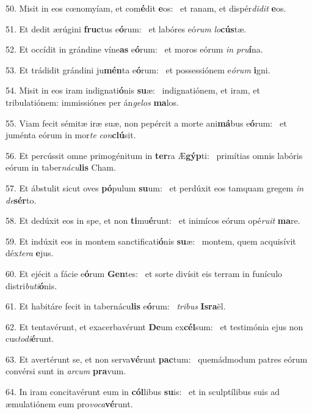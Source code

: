 50. Misit in eos cœnomyíam, et com\textbf{é}dit \textbf{e}os: \ast\  et ranam, et dispér\textit{di}\textit{dit} \textbf{e}os.\

51. Et dedit ærúgini \textbf{fruc}tus e\textbf{ó}rum: \ast\  et labóres eó\textit{rum} \textit{lo}\textbf{cús}tæ.\

52. Et occídit in grándine víne\textbf{as} e\textbf{ó}rum: \ast\  et moros eórum \textit{in} \textit{pru}\textbf{í}na.\

53. Et trádidit grándini ju\textbf{mén}ta e\textbf{ó}rum: \ast\  et possessiónem e\textit{ó}\textit{rum} \textbf{i}gni.\

54. Misit in eos iram indignati\textbf{ó}nis \textbf{su}æ: \ast\  indignatiónem, et iram, et tribulatiónem: immissiónes per án\textit{ge}\textit{los} \textbf{ma}los.\

55. Viam fecit sémitæ iræ suæ, non pepércit a morte ani\textbf{má}bus e\textbf{ó}rum: \ast\  et juménta eórum in mor\textit{te} \textit{con}\textbf{clú}sit.\

56. Et percússit omne primogénitum in \textbf{ter}ra Æ\textbf{gýp}ti: \ast\  primítias omnis labóris eórum in taber\textit{ná}\textit{cu}\textbf{lis} Cham.\

57. Et ábstulit sicut oves \textbf{pó}pulum \textbf{su}um: \ast\  et perdúxit eos tamquam gregem \textit{in} \textit{de}\textbf{sér}to.\

58. Et dedúxit eos in spe, et non \textbf{ti}mu\textbf{é}runt: \ast\  et inimícos eórum opé\textit{ru}\textit{it} \textbf{ma}re.\

59. Et indúxit eos in montem sanctificati\textbf{ó}nis \textbf{su}æ: \ast\  montem, quem acquisívit déx\textit{te}\textit{ra} \textbf{e}jus.\

60. Et ejécit a fácie e\textbf{ó}rum \textbf{Gen}tes: \ast\  et sorte divísit eis terram in funículo distri\textit{bu}\textit{ti}\textbf{ó}nis.\

61. Et habitáre fecit in tabernácu\textbf{lis} e\textbf{ó}rum: \ast\  \textit{tri}\textit{bus} \textbf{Is}\textbf{ra}ël.\

62. Et tentavérunt, et exacerbavérunt \textbf{De}um ex\textbf{cél}sum: \ast\  et testimónia ejus non cus\textit{to}\textit{di}\textbf{é}runt.\

63. Et avertérunt se, et non serva\textbf{vé}runt \textbf{pac}tum: \ast\  quemádmodum patres eórum convérsi sunt in \textit{ar}\textit{cum} \textbf{pra}vum.\

64. In iram concitavérunt eum in \textbf{cól}libus \textbf{su}is: \ast\  et in sculptílibus suis ad æmulatiónem eum pro\textit{vo}\textit{ca}\textbf{vé}runt.\

